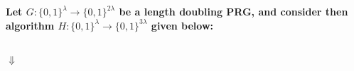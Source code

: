 \documentclass[letterpaper,12pt,notitlepage,fleqn]{article}
\begin{document}
\section{}
\textbf{Let $G:\lbrace0,1\rbrace^{\lambda} \rightarrow \lbrace0,1\rbrace^{2\lambda}$ be a length doubling PRG, and consider then algorithm $H:\lbrace0,1\rbrace^{\lambda} \rightarrow \lbrace0,1\rbrace^{3\lambda}$ given below:}
\begin{center}
\begin{multicols}{2}
\\ $\Downarrow$
\columnbreak
\begin{flushright}


\end{flushright}
\end{multicols}

\begin{multicols}{2}
\columnbreak
\begin{flushright}



\end{flushright}
\end{multicols}
\end{center}
\end{document}
